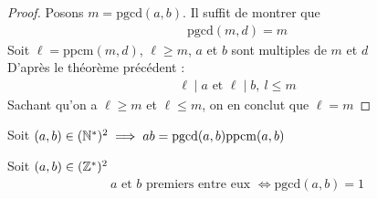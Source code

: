 \begin{proof}
Posons $m = \mathrm{pgcd}(a, b)$. Il suffit de montrer que 
\begin{align*}
\mathrm{pgcd}(m, d) = m
\end{align*}
Soit $\ell = \mathrm{ppcm}(m ,d)$, $\ell \geq m$, $a$ et $b$ sont multiples de $m$ et $d$
\\
D'après le théorème précédent : 
\begin{align*}
\ell \mid a \text{ et } \ell \mid b, \ l \leq m
\end{align*}
Sachant qu'on a $\ell \geq m$ et $\ell \leq m$, on en conclut que $\ell = m$
\end{proof}

\begin{graybox}
\begin{theoreme}
Soit $(a, b) \in (\mathbb{N}^*)^2 \implies ab = \mathrm{pgcd}(a, b)\mathrm{ppcm}(a, b)$
\end{theoreme}
\end{graybox}

\begin{graybox}
\begin{definition}
	Soit $(a, b) \in (\mathbb{Z}^*)^2$
	\begin{align*}
	a \text{ et } b \text{ premiers entre eux } \iff \mathrm{pgcd}(a, b) = 1
	\end{align*}
\end{definition}
\end{graybox}

